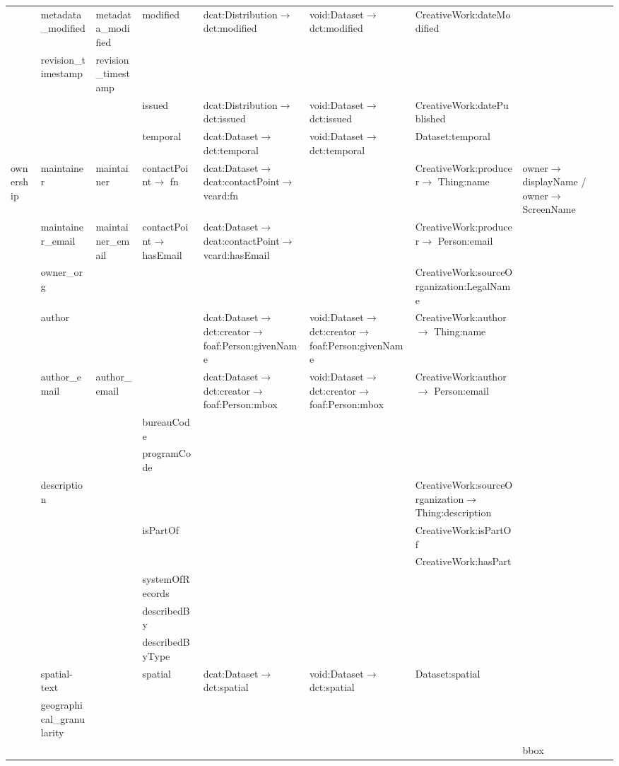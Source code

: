 \documentclass[runningheads,a4paper]{llncs}
\begin{document}
{\begin{landscape}
{\begin{longtable}{|p{1cm}|m{2.9cm}|m{2.4cm}|m{2.6cm}|p{3.8cm}|m{3.8cm}|m{6.5cm}|m{2.5cm}|}
 & metadata\_modified & metadata\_modified & modified & dcat:Distribution$\rightarrow$ dct:modified & void:Dataset$\rightarrow$ dct:modified & CreativeWork:dateModified & \tabularnewline
\cline{2-8}
 & revision\_timestamp & revision\_timestamp &  &  &  &  & \tabularnewline
\cline{2-8}
 &  &  & issued & dcat:Distribution$\rightarrow$ dct:issued & void:Dataset$\rightarrow$ dct:issued & CreativeWork:datePublished & \tabularnewline
\cline{2-8}
 &  &  & temporal & dcat:Dataset$\rightarrow$ dct:temporal & void:Dataset$\rightarrow$ dct:temporal & Dataset:temporal & \tabularnewline
\hline
\multirow{14}{2cm}{ownership} & maintainer & maintainer & contactPoint$\rightarrow$ fn & dcat:Dataset$\rightarrow$ dcat:contactPoint$\rightarrow$ vcard:fn &  & CreativeWork:producer$\rightarrow$ Thing:name & owner$\rightarrow$ displayName / owner$\rightarrow$ ScreenName\tabularnewline
\cline{2-8}
 & maintainer\_email & maintainer\_email & contactPoint$\rightarrow$ hasEmail & dcat:Dataset$\rightarrow$ dcat:contactPoint$\rightarrow$ vcard:hasEmail &  & CreativeWork:producer$\rightarrow$ Person:email & \tabularnewline
\cline{2-8}
 & owner\_org &  &  &  &  & CreativeWork:sourceOrganization:LegalName & \tabularnewline
\cline{2-8}
 & author &  &  & dcat:Dataset$\rightarrow$ dct:creator$\rightarrow$ foaf:Person:givenName & void:Dataset$\rightarrow$ dct:creator$\rightarrow$ foaf:Person:givenName & CreativeWork:author$\rightarrow$ Thing:name & \tabularnewline
\cline{2-8}
 & author\_email & author\_email &  & dcat:Dataset$\rightarrow$ dct:creator$\rightarrow$ foaf:Person:mbox & void:Dataset$\rightarrow$ dct:creator$\rightarrow$ foaf:Person:mbox & CreativeWork:author$\rightarrow$ Person:email & \tabularnewline
\cline{2-8}
 &  &  & bureauCode &  &  &  & \tabularnewline
\cline{2-8}
 &  &  & programCode &  &  &  & \tabularnewline
\cline{2-8}
 & description &  &  &  &  & CreativeWork:sourceOrganization$\rightarrow$ Thing:description & \tabularnewline
\cline{2-8}
 &  &  & isPartOf &  &  & CreativeWork:isPartOf & \tabularnewline
\cline{2-8}
 &  &  &  &  &  & CreativeWork:hasPart & \tabularnewline
\cline{2-8}
 &  &  & systemOfRecords &  &  &  & \tabularnewline
\cline{2-8}
 &  &  & describedBy &  &  &  & \tabularnewline
\cline{2-8}
 &  &  & describedByType &  &  &  & \tabularnewline
\hline
\multirow{6}{2cm}{GeoSpatial} & spatial-text &  & spatial & dcat:Dataset$\rightarrow$ dct:spatial & void:Dataset$\rightarrow$ dct:spatial & Dataset:spatial & \tabularnewline
\cline{2-8}
 & geographical\_granularity &  &  &  &  &  & \tabularnewline
\cline{2-8}
 &  &  &  &  &  &  & bbox\tabularnewline
\cline{2-8}

\end{longtable}}
\end{landscape}}
\end{document}
